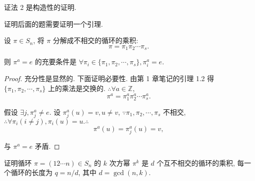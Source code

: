 \documentclass{ctexart}
\begin{document}
\begin{note}
    证法 2 是构造性的证明.
\end{note}
证明后面的题需要证明一个引理.
\begin{lemma}\label{l4.1}
    设 $\pi\in S_n$, 将 $\pi$ 分解成不相交的循环的乘积:
    \[\pi=\pi_1\pi_2\cdots\pi_s.\]

    则 $\pi^a=e$ 的充要条件是 $\forall\pi_i\in\{\pi_1,\pi_2,\cdots,\pi_s\},\pi_i^a=e$.
\end{lemma}
\begin{proof}
    充分性是显然的. 下面证明必要性. 由第 1 章笔记的引理 1.2 得 $\{\pi_1,\pi_2,\cdots,\pi_s\}$ 上的乘法是交换的. $\therefore\forall a\in\mathbb{Z}$,
    \[\pi^a=\pi_1^a\pi_2^a\cdots\pi_s^a.\]

    假设 $\exists j,\pi_j^a\neq e$. 设 $\pi_j^a(u)=v,u\neq v$, $\because\pi_1,\pi_2,\cdots,\pi_s$ 不相交, $\therefore\forall\pi_i(i\neq j),\pi_i(u)=u.\therefore$
    \[\pi^a(u)=\pi_j^a(u)=v,\]

    与 $\pi^a=e$ 矛盾.
\end{proof}
\begin{exercise}[2.12]
    证明循环 $\pi=(12\cdots n)\in S_n$ 的 $k$ 次方幂 $\pi^k$ 是 $d$ 个互不相交的循环的乘积, 每一个循环的长度为 $q=n/d$, 其中 $d=\operatorname{gcd}(n,k)$.
\end{exercise}
\end{document}
